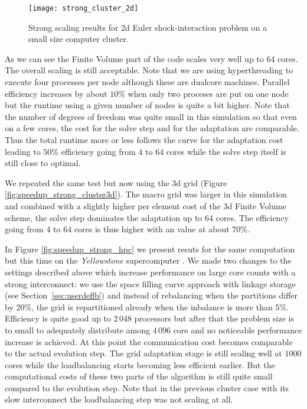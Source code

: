 \documentclass[10pt,notitlepage,a4paper]{article}
\begin{document}
\begin{figure}[!ht]
\begin{center}
  \texttt{[image: strong\_cluster\_2d]}
  \caption{Strong scaling results for 2d Euler shock-interaction problem on a small size
  computer cluster. 
}
  \label{fig:speedup_strong_cluster2d}
\end{center}
\end{figure}  

As we can see the Finite Volume part of the 
code scales very well up to $64$ cores. The overall scaling is still
acceptable. Note that we are using hyperthreading to execute four
processes per node although these are dualcore machines. Parallel
efficiency increases by about $10\%$ when only two proceses are put on one
node but the runtime using a given number of nodes is quite a bit higher. 
Note that the number of degrees of freedom 
was quite small in this simulation so that even on a
few cores, the cost for the solve step and for the adaptation are comparable. Thus the
total runtime more or less follows the curve for the adaptation cost leading to
$50\%$ efficiency going from $4$ to $64$ cores while the solve step itself is still
close to optimal.

We repeated the same test but now using the 3d grid (Figure \ref{fig:speedup_strong_cluster3d}). 
The macro grid was larger in this
simulation and combined with a slightly higher per element
cost of the 3d Finite Volume scheme, the solve step dominates the adaptation
up to 64 cores. The efficiency going from $4$ to $64$ cores is thus higher with an
value at about $70\%$.

In Figure \ref{fig:speedup_strong_hpc} we present resuts for the same
computation but this time on the \emph{Yellowstone} supercomputer
\cite{Yellowstone}. We made two
changes to the settings described above which increase performance on large
core counts with a strong interconnect: we use the space filling curve
approach with linkage storage (see Section~\ref{sec:userdeflb}) and instead of
rebalancing when the partitions differ by $20\%$, the grid is repartitioned
already when the inbalance is more than $5\%$.
Efficiency is quite good up to $2\,048$ processors but after that the problem
size is to small to adequately distribute among $4\,096$ core 
and no noticeable performance increase is achieved. At
this point the communication cost becomes comparable to the actual
evolution step. The grid adaptation stage is still scaling well at $1000$
cores while the loadbalancing starts becoming less efficient earlier. But
the computational costs of these two parts of the algorithm is still quite 
small compared to the evolution step. Note that in the previous cluster case with
its slow interconnect the loadbalancing step was not scaling at all. 
\end{document}
